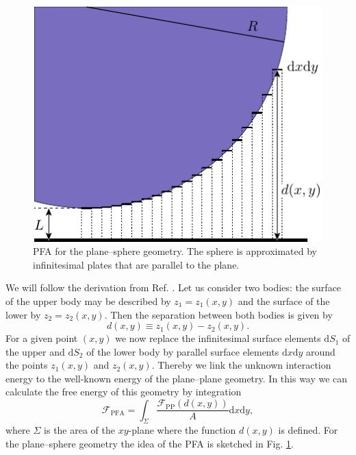 \begin{figure}
  \begin{center}
      \includegraphics[scale=0.85]{images/pfa.pdf}
  \end{center}
  \caption{PFA for the plane--sphere geometry. The sphere is approximated by infinitesimal plates that are parallel to the plane.}
  \label{fig:pfa_idea}
\end{figure}
We will follow the derivation from Ref. \cite{CasimirAdvances}. Let us consider two bodies: the
surface of the upper body may be described by $z_1 = z_1(x,y)$ and the surface
of the lower by $z_2 = z_2(x,y)$. Then the separation between both bodies is given by
\begin{equation}
d(x,y) \equiv z_1(x,y)-z_2(x,y).
\end{equation}
For a given point $(x,y)$ we now replace the infinitesimal surface elements
$\mathrm{d}S_1$ of the upper and $\mathrm{d}S_2$ of the lower body by parallel
surface elements $\mathrm{d}x \mathrm{d}y$ around the points $z_1(x,y)$ and
$z_2(x,y)$. Thereby we link the unknown interaction energy to the well-known
energy of the plane--plane geometry. In this way we can calculate the free energy
of this geometry by integration 
\begin{equation}
\mathcal{F}_\text{PFA} = \int_\Sigma \frac{\mathcal{F}_\text{PP}(d(x,y))}{A} \mathrm{d}x \mathrm{d}y,
\end{equation}
where $\Sigma$ is the area of the $xy$-plane where the function $d(x,y)$ is
defined. For the plane--sphere geometry the idea of the PFA is sketched in Fig. \ref{fig:pfa_idea}.

